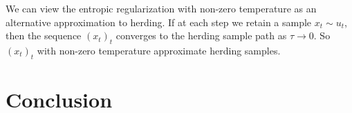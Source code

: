 \documentclass{article}
\begin{document}
We can view the entropic regularization
with non-zero temperature as an alternative approximation to herding. If at each step we
retain a sample $x_{t} \sim u_{t}$, then the sequence $(x_{t})_{t}$ converges to the 
herding sample path as $\tau \to 0$. So $(x_{t})_{t}$ with non-zero temperature approximate
herding samples. 




\section{Conclusion}
\label{sec:conclusion}

%
%
\end{document}
